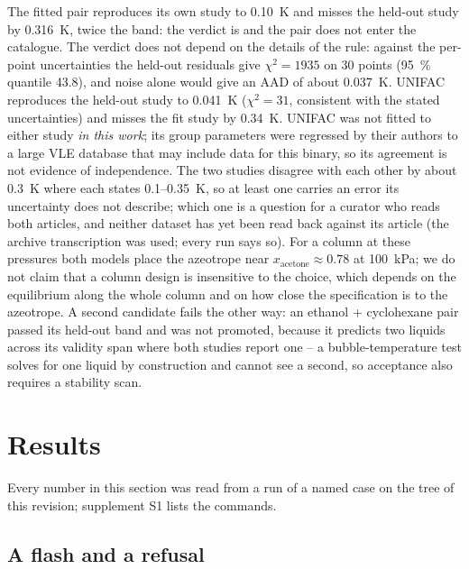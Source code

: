 \documentclass[preprint,12pt]{elsarticle}
\newcommand{\code}[1]{\texttt{\detokenize{#1}}}
\begin{document}
The fitted pair reproduces its own study to 0.10~K and misses the
held-out study by 0.316~K, twice the band: the verdict is
\code{notValidated} and the pair does not enter the catalogue.  The
verdict does not depend on the details of the rule: against the per-point
uncertainties the held-out residuals give $\chi^2 = 1935$ on 30 points
(95~\% quantile 43.8), and noise alone would give an AAD of about
0.037~K.  UNIFAC reproduces the held-out study to 0.041~K ($\chi^2 = 31$,
consistent with the stated uncertainties) and misses the fit study by
0.34~K.  UNIFAC was not fitted to either study \emph{in this work}; its
group parameters were regressed by their authors to a large VLE database
that may include data for this binary, so its agreement is not evidence
of independence.  The two studies disagree with each other by about
0.3~K where each states 0.1--0.35~K, so at least one carries an error its
uncertainty does not describe; which one is a question for a curator who
reads both articles, and neither dataset has yet been read back against
its article (the archive transcription was used; every run says so).
For a column at these pressures both models place the azeotrope near
$x_\text{acetone}\approx 0.78$ at 100~kPa; we do not claim that a column
design is insensitive to the choice, which depends on the equilibrium
along the whole column and on how close the specification is to the
azeotrope.  A second candidate fails the other way: an ethanol +
cyclohexane pair passed its held-out band and was not promoted, because
it predicts two liquids across its validity span where both studies
report one -- a bubble-temperature test solves for one liquid by
construction and cannot see a second, so acceptance also requires a
stability scan.

\section{Results}
\label{sec:examples}

Every number in this section was read from a run of a named case on the
tree of this revision; supplement S1 lists the commands.

\subsection{A flash and a refusal}
\label{sec:ex-simple}
\end{document}
